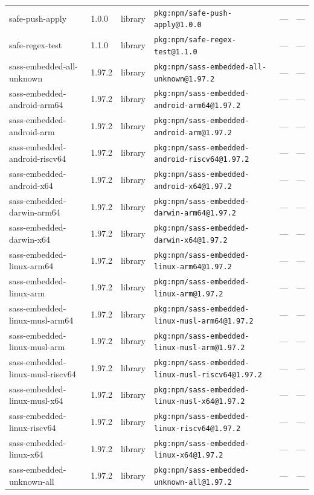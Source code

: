 \documentclass[11pt]{article}
\begin{document}
\begin{longtable}{|l|l|l|p{2.2cm}|l|p{4cm}|}
safe-push-apply & 1.0.0 & library & \texttt{pkg:npm/safe-push-apply@1.0.0} & — & — \\
safe-regex-test & 1.1.0 & library & \texttt{pkg:npm/safe-regex-test@1.1.0} & — & — \\
sass-embedded-all-unknown & 1.97.2 & library & \texttt{pkg:npm/sass-embedded-all-unknown@1.97.2} & — & — \\
sass-embedded-android-arm64 & 1.97.2 & library & \texttt{pkg:npm/sass-embedded-android-arm64@1.97.2} & — & — \\
sass-embedded-android-arm & 1.97.2 & library & \texttt{pkg:npm/sass-embedded-android-arm@1.97.2} & — & — \\
sass-embedded-android-riscv64 & 1.97.2 & library & \texttt{pkg:npm/sass-embedded-android-riscv64@1.97.2} & — & — \\
sass-embedded-android-x64 & 1.97.2 & library & \texttt{pkg:npm/sass-embedded-android-x64@1.97.2} & — & — \\
sass-embedded-darwin-arm64 & 1.97.2 & library & \texttt{pkg:npm/sass-embedded-darwin-arm64@1.97.2} & — & — \\
sass-embedded-darwin-x64 & 1.97.2 & library & \texttt{pkg:npm/sass-embedded-darwin-x64@1.97.2} & — & — \\
sass-embedded-linux-arm64 & 1.97.2 & library & \texttt{pkg:npm/sass-embedded-linux-arm64@1.97.2} & — & — \\
sass-embedded-linux-arm & 1.97.2 & library & \texttt{pkg:npm/sass-embedded-linux-arm@1.97.2} & — & — \\
sass-embedded-linux-musl-arm64 & 1.97.2 & library & \texttt{pkg:npm/sass-embedded-linux-musl-arm64@1.97.2} & — & — \\
sass-embedded-linux-musl-arm & 1.97.2 & library & \texttt{pkg:npm/sass-embedded-linux-musl-arm@1.97.2} & — & — \\
sass-embedded-linux-musl-riscv64 & 1.97.2 & library & \texttt{pkg:npm/sass-embedded-linux-musl-riscv64@1.97.2} & — & — \\
sass-embedded-linux-musl-x64 & 1.97.2 & library & \texttt{pkg:npm/sass-embedded-linux-musl-x64@1.97.2} & — & — \\
sass-embedded-linux-riscv64 & 1.97.2 & library & \texttt{pkg:npm/sass-embedded-linux-riscv64@1.97.2} & — & — \\
sass-embedded-linux-x64 & 1.97.2 & library & \texttt{pkg:npm/sass-embedded-linux-x64@1.97.2} & — & — \\
sass-embedded-unknown-all & 1.97.2 & library & \texttt{pkg:npm/sass-embedded-unknown-all@1.97.2} & — & — \\

\end{longtable}
\end{document}
